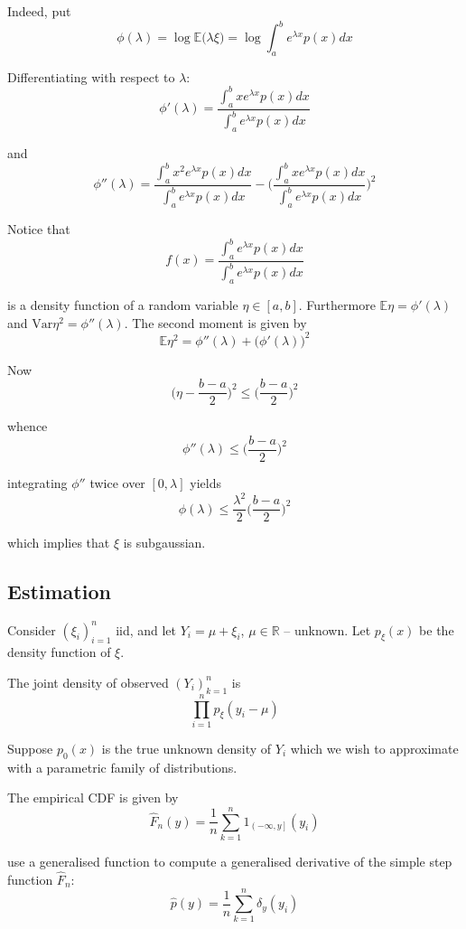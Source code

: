 \documentclass[a4paper]{article}
\newcommand{\clo}[1]{{\left [ #1 \right ]}}
\newcommand{\ploc}[1]{{\left ( #1 \right ]}}
\newcommand{\brac}[1]{{\left ( #1 \right )}}
\newcommand{\Real}{\mathbb{R}}
\newcommand{\ex}{\mathbb{E}}
\newcommand{\Var}{\text{Var}}
\begin{document}
Indeed, put
\[\phi(\lambda) = \log \ex\big(\lambda \xi\big) = \log \int_a^b e^{\lambda x} p(x) dx\]

Differentiating with respect to $\lambda$:
\[\phi'(\lambda) = \frac{\int_a^b x e^{\lambda x} p(x) dx}{\int_a^b e^{\lambda x} p(x) dx}\]

and 
\[\phi''(\lambda) = \frac{\int_a^b x^2 e^{\lambda x} p(x) dx}{\int_a^b e^{\lambda x} p(x) dx} - \bigg( \frac{\int_a^b x e^{\lambda x} p(x) dx}{\int_a^b e^{\lambda x} p(x) dx} \bigg)^2\]

Notice that
\[f(x) = \frac{\int_a^b e^{\lambda x} p(x) dx}{\int_a^b e^{\lambda x} p(x) dx}\]

is a density function of a random variable $\eta\in \clo{a,b}$. Furthermore $\ex \eta = \phi'(\lambda)$ and $\Var \eta^2 = \phi''(\lambda)$. The second moment is given by
\[\ex \eta^2 = \phi''(\lambda) + \big(\phi'(\lambda)\big)^2\]

Now
\[\bigg(\eta - \frac{b-a}{2}\bigg)^2 \leq \bigg(\frac{b-a}{2}\bigg)^2\]

whence 
\[\phi''(\lambda) \leq \bigg(\frac{b-a}{2}\bigg)^2 \]

integrating $\phi''$ twice over $\clo{0,\lambda}$ yields
\[\phi(\lambda) \leq \frac{\lambda^2}{2}\bigg(\frac{b-a}{2}\bigg)^2\]

which implies that $\xi$ is subgaussian.


\subsection{Estimation} %
\label{sub:estimation}

Consider $\brac{\xi_i}_{i=1}^n$ iid, and let $Y_i = \mu + \xi_i$, $\mu\in \Real$ -- unknown. Let $p_\xi(x)$ be the density function of $\xi$.

The joint density of observed $\brac{Y_i}_{k=1}^n$ is 
\[\prod_{i=1}^n p_\xi(y_i - \mu)\]

Suppose $p_0(x)$ is the true unknown density of $Y_i$ which we wish to approximate with a parametric family of distributions.

The empirical CDF is given by
\[\hat{F}_n(y) = \frac{1}{n}\sum_{k=1}^n 1_{\ploc{-\infty, y}}(y_i)\]

use a generalised function to compute a generalised derivative of the simple step function $\hat{F}_n$:
\[ \hat{p}(y) = \frac{1}{n} \sum_{k=1}^n \delta_y(y_i) \]

\end{document}
